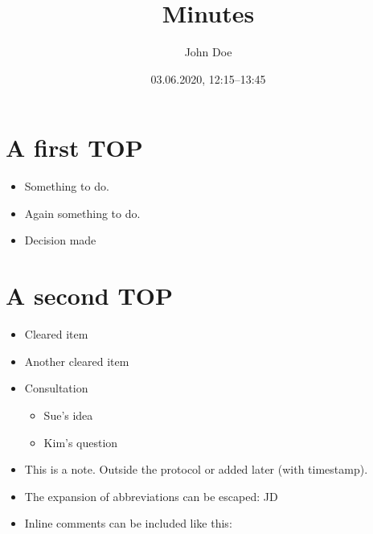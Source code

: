 \documentclass[11pt]{article}
\author{John Doe}
\date{03.06.2020, 12:15--13:45}
\title{Minutes}
\begin{document}
\maketitle
\tableofcontents


\section{\texorpdfstring{}{}A first TOP}
\label{sec:org1b0394b}
\begin{itemize}
\item {} Something to do.
\item \ActionTag{}{::} \ActionTagMargin{}Again something to do.
\item \EntscheidungTag{}{::} \EntscheidungTagMargin{ }Decision made
\end{itemize}
\section{A second TOP}
\label{sec:org6dc9dbe}
\begin{itemize}
\item {} Cleared item
\item \ClearedTag{}{::} \ClearedTagMargin{ }Another cleared item
\item \ConsultationTag{}{::} \ConsultationTagMargin{ }Consultation 
\begin{itemize}
\item {}Sue's idea
\item {}Kim's question
\end{itemize}
\item \NoteTag{}{::}This is a note. Outside the protocol or added later (with timestamp).
\item The expansion of abbreviations can be escaped: JD
\item Inline comments can be included like this: 
\end{itemize}
\end{document}
